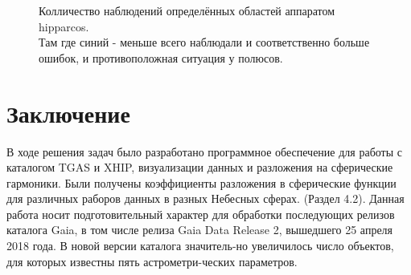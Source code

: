 \documentclass[14pt]{article} %
\begin{document}
\begin{figure}[h!]
\caption{Колличество наблюдений определённых областей аппаратом hipparcos.\\Там где синий - меньше всего наблюдали и соответственно больше ошибок, и противоположная ситуация у полюсов.}
\label{img:nobs}
\end{figure}



\section{Заключение}\label{conclusion}
В ходе решения задач было разработано программное обеспечение для работы с каталогом TGAS и XHIP, визуализации данных и разложения на сферические гармоники. Были получены коэффициенты разложения в сферические функции для различных раборов данных в разных Небесных сферах. (Раздел 4.2).
Данная работа носит подготовительный характер для обработки последующих релизов каталога Gaia, в том числе релиза Gaia
Data Release 2, вышедшего 25 апреля 2018 года. В новой версии каталога значитель-но увеличилось число объектов, для которых известны пять астрометри-ческих параметров.
\end{document}
